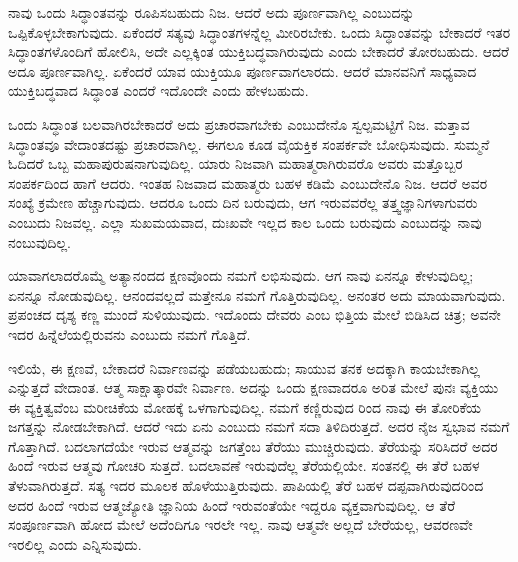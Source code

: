 ನಾವು ಒಂದು ಸಿದ್ಧಾಂತವನ್ನು ರೂಪಿಸಬಹುದು ನಿಜ. ಆದರೆ ಅದು ಪೂರ್ಣವಾಗಿಲ್ಲ ಎಂಬುದನ್ನು ಒಪ್ಪಿಕೊಳ್ಳಬೇಕಾಗುವುದು. ಏಕೆಂದರೆ ಸತ್ಯವು ಸಿದ್ಧಾಂತಗಳನ್ನೆಲ್ಲ ಮೀರಿರಬೇಕು. ಒಂದು ಸಿದ್ಧಾಂತವನ್ನು ಬೇಕಾದರೆ ಇತರ ಸಿದ್ಧಾಂತಗಳೊಂದಿಗೆ ಹೋಲಿಸಿ, ಅದೇ ಎಲ್ಲಕ್ಕಿಂತ ಯುಕ್ತಿಬದ್ಧವಾಗಿರುವುದು ಎಂದು ಬೇಕಾದರೆ ತೋರಬಹುದು. ಆದರೆ ಅದೂ ಪೂರ್ಣವಾಗಿಲ್ಲ. ಏಕೆಂದರೆ ಯಾವ ಯುಕ್ತಿಯೂ ಪೂರ್ಣವಾಗಲಾರದು. ಆದರೆ ಮಾನವನಿಗೆ ಸಾಧ್ಯವಾದ ಯುಕ್ತಿಬದ್ಧವಾದ ಸಿದ್ಧಾಂತ ಎಂದರೆ ಇದೊಂದೇ ಎಂದು ಹೇಳಬಹುದು.

ಒಂದು ಸಿದ್ಧಾಂತ ಬಲವಾಗಿರಬೇಕಾದರೆ ಅದು ಪ್ರಚಾರವಾಗಬೇಕು ಎಂಬುದೇನೊ ಸ್ವಲ್ಪಮಟ್ಟಿಗೆ ನಿಜ. ಮತ್ತಾವ ಸಿದ್ಧಾಂತವೂ ವೇದಾಂತದಷ್ಟು ಪ್ರಚಾರವಾಗಿಲ್ಲ. ಈಗಲೂ ಕೂಡ ವೈಯಕ್ತಿಕ ಸಂಪರ್ಕವೇ ಬೋಧಿಸುವುದು. ಸುಮ್ಮನೆ ಓದಿದರೆ ಒಬ್ಬ ಮಹಾಪುರುಷನಾಗುವುದಿಲ್ಲ. ಯಾರು ನಿಜವಾಗಿ ಮಹಾತ್ಮರಾಗಿರುವರೊ ಅವರು ಮತ್ತೊಬ್ಬರ ಸಂಪರ್ಕದಿಂದ ಹಾಗೆ ಆದರು. ಇಂತಹ ನಿಜವಾದ ಮಹಾತ್ಮರು ಬಹಳ ಕಡಿಮೆ ಎಂಬುದೇನೊ ನಿಜ. ಆದರೆ ಅವರ ಸಂಖ್ಯೆ ಕ್ರಮೇಣ ಹೆಚ್ಚಾಗುವುದು. ಆದರೂ ಒಂದು ದಿನ ಬರುವುದು, ಆಗ ಇರುವವರೆಲ್ಲ ತತ್ತ್ವಜ್ಞಾನಿಗಳಾಗುವರು ಎಂಬುದು ನಿಜವಲ್ಲ. ಎಲ್ಲಾ ಸುಖಮಯವಾದ, ದುಃಖವೇ ಇಲ್ಲದ ಕಾಲ ಒಂದು ಬರುವುದು ಎಂಬುದನ್ನು ನಾವು ನಂಬುವುದಿಲ್ಲ.

ಯಾವಾಗಲಾದರೊಮ್ಮೆ ಅತ್ಯಾನಂದದ ಕ್ಷಣವೊಂದು ನಮಗೆ ಲಭಿಸುವುದು. ಆಗ ನಾವು ಏನನ್ನೂ ಕೇಳುವುದಿಲ್ಲ; ಏನನ್ನೂ ನೋಡುವುದಿಲ್ಲ. ಆನಂದವಲ್ಲದೆ ಮತ್ತೇನೂ ನಮಗೆ ಗೊತ್ತಿರುವುದಿಲ್ಲ. ಅನಂತರ ಅದು ಮಾಯವಾಗುವುದು. ಪ್ರಪಂಚದ ದೃಶ್ಯ ಕಣ್ಣ ಮುಂದೆ ಸುಳಿಯುವುದು. ಇದೊಂದು ದೇವರು ಎಂಬ ಭಿತ್ತಿಯ ಮೇಲೆ ಬಿಡಿಸಿದ ಚಿತ್ರ; ಅವನೇ ಇದರ ಹಿನ್ನೆಲೆಯಲ್ಲಿರುವನು ಎಂಬುದು ನಮಗೆ ಗೊತ್ತಿದೆ.

ಇಲಿಯೆ, ಈ ಕ್ಷಣವೆ, ಬೇಕಾದರೆ ನಿರ್ವಾಣವನ್ನು ಪಡೆಯಬಹುದು; ಸಾಯುವ ತನಕ ಅದಕ್ಕಾಗಿ ಕಾಯಬೇಕಾಗಿಲ್ಲ ಎನ್ನುತ್ತದೆ ವೇದಾಂತ. ಆತ್ಮ ಸಾಕ್ಷಾತ್ಕಾರವೇ ನಿರ್ವಾಣ. ಅದನ್ನು ಒಂದು ಕ್ಷಣವಾದರೂ ಅರಿತ ಮೇಲೆ ಪುನಃ ವ್ಯಕ್ತಿಯು ಈ ವ್ಯಕ್ತಿತ್ವವೆಂಬ ಮರೀಚಿಕೆಯ ಮೋಹಕ್ಕೆ ಒಳಗಾಗುವುದಿಲ್ಲ. ನಮಗೆ ಕಣ್ಣಿರುವುದ ರಿಂದ ನಾವು ಈ ತೋರಿಕೆಯ ಜಗತ್ತನ್ನು ನೋಡಬೇಕಾಗಿದೆ. ಆದರೆ ಇದು ಏನು ಎಂಬುದು ನಮಗೆ ಸದಾ ತಿಳಿದಿರುತ್ತದೆ. ಅದರ ನೈಜ ಸ್ವಭಾವ ನಮಗೆ ಗೊತ್ತಾಗಿದೆ. ಬದಲಾಗದೆಯೇ ಇರುವ ಆತ್ಮವನ್ನು ಜಗತ್ತೆಂಬ ತೆರೆಯು ಮುಚ್ಚಿರುವುದು. ತೆರೆಯನ್ನು ಸರಿಸಿದರೆ ಅದರ ಹಿಂದೆ ಇರುವ ಆತ್ಮವು ಗೋಚರಿ ಸುತ್ತದೆ. ಬದಲಾವಣೆ ಇರುವುದೆಲ್ಲ ತೆರೆಯಲ್ಲಿಯೇ. ಸಂತನಲ್ಲಿ ಈ ತೆರೆ ಬಹಳ ತೆಳುವಾಗಿರುತ್ತದೆ. ಸತ್ಯ ಇದರ ಮೂಲಕ ಹೊಳೆಯುತ್ತಿರುವುದು. ಪಾಪಿಯಲ್ಲಿ ತೆರೆ ಬಹಳ ದಪ್ಪವಾಗಿರುವುದರಿಂದ ಅದರ ಹಿಂದೆ ಇರುವ ಆತ್ಮಜ್ಯೋತಿ ಜ್ಞಾನಿಯ ಹಿಂದೆ ಇರುವಂತೆಯೇ ಇದ್ದರೂ ವ್ಯಕ್ತವಾಗುವುದಿಲ್ಲ. ಆ ತೆರೆ ಸಂಪೂರ್ಣವಾಗಿ ಹೋದ ಮೇಲೆ ಅದೆಂದಿಗೂ ಇರಲೇ ಇಲ್ಲ. ನಾವು ಆತ್ಮವೇ ಅಲ್ಲದೆ ಬೇರೆಯಲ್ಲ, ಆವರಣವೇ ಇರಲಿಲ್ಲ ಎಂದು ಎನ್ನಿಸುವುದು.

